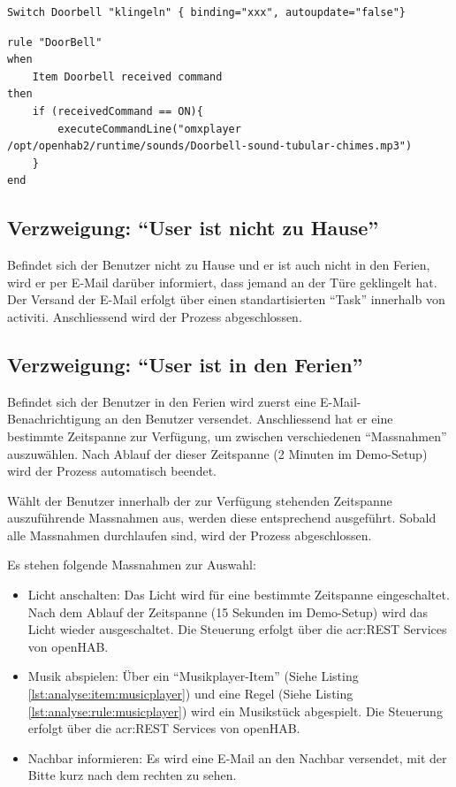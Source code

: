 \begin{lstlisting}[caption={Item-Definition für die "`Virtuelle Türklingel"'},label={lst:analyse:item:doorbell}]
Switch Doorbell "klingeln" { binding="xxx", autoupdate="false"}
\end{lstlisting}

\begin{lstlisting}[caption={Item-Regel für die "`Virtuelle Türklingel"'},label={lst:analyse:rule:doorbell}]
rule "DoorBell"
when
	Item Doorbell received command
then
	if (receivedCommand == ON){
		executeCommandLine("omxplayer /opt/openhab2/runtime/sounds/Doorbell-sound-tubular-chimes.mp3")
	}
end

\end{lstlisting}

\subsection{Verzweigung: "`User ist nicht zu Hause"'}
Befindet sich der Benutzer nicht zu Hause und er ist auch nicht in den Ferien, wird er per E-Mail darüber informiert, dass jemand an der Türe geklingelt hat. Der Versand der E-Mail erfolgt über einen standartisierten "`Task"' innerhalb von activiti. Anschliessend wird der Prozess abgeschlossen.

\subsection{Verzweigung: "`User ist in den Ferien"'}
Befindet sich der Benutzer in den Ferien wird zuerst eine E-Mail-Benachrichtigung an den Benutzer versendet. Anschliessend hat er eine bestimmte Zeitspanne zur Verfügung, um zwischen verschiedenen "`Massnahmen"' auszuwählen. Nach Ablauf der dieser Zeitspanne (2 Minuten im Demo-Setup) wird der Prozess automatisch beendet.

Wählt der Benutzer innerhalb der zur Verfügung stehenden Zeitspanne auszuführende Massnahmen aus, werden diese entsprechend ausgeführt. Sobald alle Massnahmen durchlaufen sind, wird der Prozess abgeschlossen. 

Es stehen folgende Massnahmen zur Auswahl:

\begin{itemize}
\item Licht anschalten: Das Licht wird für eine bestimmte Zeitspanne eingeschaltet. Nach dem Ablauf der Zeitspanne (15 Sekunden im Demo-Setup) wird das Licht wieder ausgeschaltet. Die Steuerung erfolgt über die \gls{acr:REST} Services von openHAB.
\item Musik abspielen: Über ein "`Musikplayer-Item"' (Siehe Listing \ref{lst:analyse:item:musicplayer}) und eine Regel (Siehe Listing \ref{lst:analyse:rule:musicplayer}) wird ein Musikstück abgespielt. Die Steuerung erfolgt über die \gls{acr:REST} Services von openHAB.
\item Nachbar informieren: Es wird eine E-Mail an den Nachbar versendet, mit der Bitte kurz nach dem rechten zu sehen.
\end{itemize}

